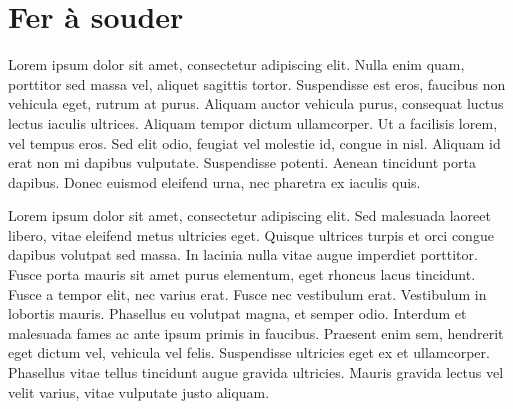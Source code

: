 \section{Fer à souder}
Lorem ipsum dolor sit amet, consectetur adipiscing elit. Nulla enim quam, porttitor sed massa vel, aliquet sagittis tortor. Suspendisse est eros, faucibus non vehicula eget, rutrum at purus. Aliquam auctor vehicula purus, consequat luctus lectus iaculis ultrices. Aliquam tempor dictum ullamcorper. Ut a facilisis lorem, vel tempus eros. Sed elit odio, feugiat vel molestie id, congue in nisl. Aliquam id erat non mi dapibus vulputate. Suspendisse potenti. Aenean tincidunt porta dapibus. Donec euismod eleifend urna, nec pharetra ex iaculis quis.

Lorem ipsum dolor sit amet, consectetur adipiscing elit. Sed malesuada laoreet libero, vitae eleifend metus ultricies eget. Quisque ultrices turpis et orci congue dapibus volutpat sed massa. In lacinia nulla vitae augue imperdiet porttitor. Fusce porta mauris sit amet purus elementum, eget rhoncus lacus tincidunt. Fusce a tempor elit, nec varius erat. Fusce nec vestibulum erat. Vestibulum in lobortis mauris. Phasellus eu volutpat magna, et semper odio. Interdum et malesuada fames ac ante ipsum primis in faucibus. Praesent enim sem, hendrerit eget dictum vel, vehicula vel felis. Suspendisse ultricies eget ex et ullamcorper. Phasellus vitae tellus tincidunt augue gravida ultricies. Mauris gravida lectus vel velit varius, vitae vulputate justo aliquam.
